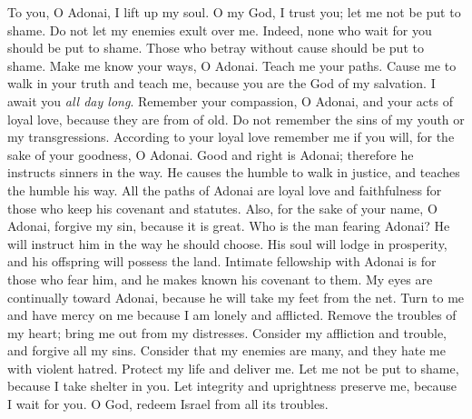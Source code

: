 \begin{biblechapter} %
 To you, O Adonai, I lift up my soul.
\verse O my God, I trust you; let me not be put to shame. 
Do not let my enemies exult over me.
\verse Indeed, none who wait for you should be put to shame. 
Those who betray without cause should be put to shame.
\verse Make me know your ways, O Adonai. 
Teach me your paths.
\verse Cause me to walk in your truth and teach me, 
because you are the God of my salvation. 
I await you \textit{all day long}.
\verse Remember your compassion, O Adonai, 
and your acts of loyal love, 
because they are from of old.
\verse Do not remember 
the sins of my youth or my transgressions. 
According to your loyal love remember me if you will, 
for the sake of your goodness, O Adonai.
\verse Good and right is Adonai; 
therefore he instructs sinners in the way.
\verse He causes the humble to walk in justice, 
and teaches the humble his way.
\verse All the paths of Adonai are loyal love and faithfulness 
for those who keep his covenant and statutes.
\verse Also, for the sake of your name, O Adonai, 
forgive my sin, because it is great.
\verse Who is the man fearing Adonai? 
He will instruct him in the way he should choose.
\verse His soul will lodge in prosperity, 
and his offspring will possess the land.
\verse Intimate fellowship with Adonai is for those who fear him, 
and he makes known his covenant to them.
\verse My eyes are continually toward Adonai, 
because he will take my feet from the net.
\verse Turn to me and have mercy on me 
because I am lonely and afflicted.
\verse Remove the troubles of my heart; 
bring me out from my distresses.
\verse Consider my affliction and trouble, 
and forgive all my sins.
\verse Consider that my enemies are many, 
and they hate me with violent hatred.
\verse Protect my life and deliver me. 
Let me not be put to shame, because I take shelter in you.
\verse Let integrity and uprightness preserve me, 
because I wait for you.
\verse O God, redeem Israel 
from all its troubles.
\end{biblechapter}

